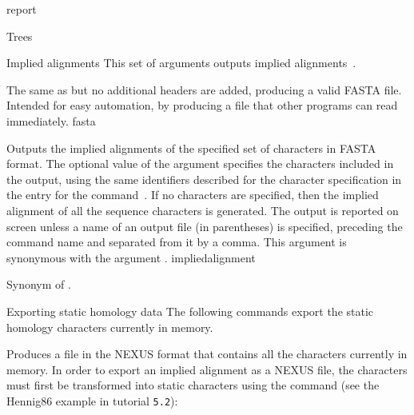 \begin{command}{report}{}
\begin{arguments}
\begin{argumentgroup}{Trees}
		\end{argumentgroup}

		\begin{argumentgroup}{Implied alignments}
            {This set of arguments outputs implied alignments~\cite{wheeler2003}.} 

            {The same as  but no additional headers
                are added, producing a valid FASTA file. Intended for easy
                automation, by producing a file that other programs can read
                immediately.}
                {fasta}

                {Outputs the implied alignments of the specified
                set of characters in FASTA format. The optional value of the
                argument specifies the characters included
                in the output, using the same identifiers described for the
                character specification in the entry for the command~. If no
                characters are specified, then the implied alignment of all the
                sequence characters is generated. The output is reported on
                screen unless a name of an output file (in parentheses) is
                specified, preceding the command name and separated from it by a
                comma. This argument is synonymous with the argument
                .}
                {impliedalignment}

                {Synonym of .}
                {}

        \end{argumentgroup}

        \begin{argumentgroup}{Exporting static homology data}
            {The following commands export the static homology characters
            currently in memory.}

                {Produces a file in the NEXUS format that contains all the
                characters currently in memory.  In
                order to export an implied alignment as a NEXUS file, the
                characters must first be transformed into static characters
                using the  command (see the Hennig86 example in tutorial \texttt{5.2}): 
                \begin{flushleft}
                     \\
                \end{flushleft}}
                {}
                

\end{argumentgroup}
\end{arguments}
\end{command}
